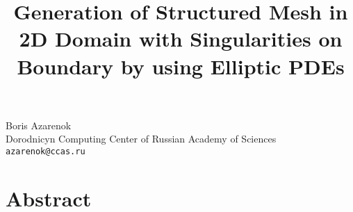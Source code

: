 \title{Generation of Structured Mesh in 2D Domain with Singularities on Boundary by using Elliptic PDEs}
\author{} \institute{}
\maketitle

\begin{center}
\vspace{-6mm}
{\large Boris Azarenok}\\
Dorodnicyn Computing Center of Russian Academy of Sciences {\tt azarenok@ccas.ru}
\end{center}

\section*{Abstract}
